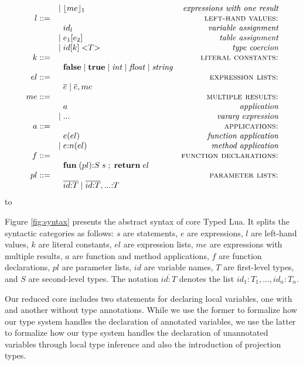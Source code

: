 \documentclass{sigplanconf}
\def\dend{\hbox to \hsize{\vrule height 4pt\hrulefill\vrule height 4pt}}
\begin{document}
\begin{figure*}[!ht]
$$\begin{array}{rlr}
& | \; \lfloor me \rfloor_{1} & \textit{expressions with one result}\\
l ::= & & \textsc{left-hand values:}\\
& \;\; id_{l} & \textit{variable assignment}\\
& | \; e_{1}[e_{2}] & \textit{table assignment}\\
& | \; id[k] \; {<}T{>} & \textit{type coercion}\\
k ::= & & \textsc{literal constants:}\\
& \;\; \mathbf{false} \; | \;
\mathbf{true} \; | \;
{\it int} \; | \;
{\it float} \; | \;
{\it string} & \\
el ::= & & \textsc{expression lists:}\\
& \;\; \overline{e} \; | \;
\overline{e}, me & \\
me ::= & & \textsc{multiple results:}\\
& \;\; a & \textit{application}\\
& | \; {...} & \textit{vararg expression}\\
a ::= & & \textsc{applications:}\\
& \;\; e(el) & \textit{function application}\\
& | \; e{:}n(el) & \textit{method application}\\
f ::= & & \textsc{function declarations:}\\
& \;\; \mathbf{fun} \; (pl){:}S \; s \;;\; \mathbf{return} \; el & \\
pl ::= & & \textsc{parameter lists:}\\
& \;\; \overline{id{:}T} \; | \;
\overline{id{:}T},{...}{:}T & \\
\end{array}
$$
\dend
\caption{The abstract syntax of Typed Lua}
\label{fig:syntax}
\end{figure*}

Figure \ref{fig:syntax} presents the abstract syntax of core Typed Lua.
It splits the syntactic categories as follows:
$s$ are statements, $e$ are expressions, $l$ are left-hand values,
$k$ are literal constants, $el$ are expression lists,
$me$ are expressions with multiple results, $a$ are function and method applications,
$f$ are function declarations, $pl$ are parameter lists,
$id$ are variable names, $T$ are first-level types, and $S$ are second-level types.
The notation $\overline{id{:}T}$ denotes the list $id_{1}{:}T_{1}, ..., id_{n}{:}T_{n}$.

Our reduced core includes two statements for declaring local variables,
one with and another without type annotations.
While we use the former to formalize how our type system handles the declaration
of annotated variables, we use the latter to formalize how our type system
handles the declaration of unannotated variables through local type inference
and also the introduction of projection types.
\end{document}
